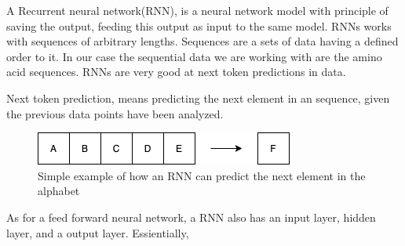 A Recurrent neural network(RNN), is a neural network model with principle of saving the output, feeding this output as input to the same model. RNNs works with sequences of arbitrary lengths. Sequences are a sets of data having a defined order to it. In our case the sequential data we are working with are the amino acid sequences. RNNs are very good at next token predictions in data.

\noindent
Next token prediction, means predicting the next element in an sequence, given the previous data points have been analyzed.

\begin{figure}[!ht]
  \centering
  \includegraphics[scale=0.4]{latex/imgs/AlphabetPred.png}
  \caption{Simple example of how an RNN can predict the next element in the alphabet}\label{Baseline:before}
\end{figure}

\noindent
As for a feed forward neural network, a RNN also has an input layer, hidden layer, and a output layer. Essientially,
